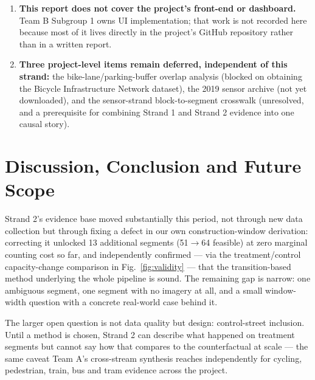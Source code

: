 \documentclass[10pt,conference]{IEEEtran}
\begin{document}
\begin{enumerate}[leftmargin=*]
\item \textbf{This report does not cover the project's front-end or dashboard.} Team B Subgroup 1 owns UI implementation; that work is not recorded here because most of it lives directly in the project's GitHub repository rather than in a written report.
\item \textbf{Three project-level items remain deferred, independent of this strand:} the bike-lane/parking-buffer overlap analysis (blocked on obtaining the Bicycle Infrastructure Network dataset), the 2019 sensor archive (not yet downloaded), and the sensor-strand block-to-segment crosswalk (unresolved, and a prerequisite for combining Strand 1 and Strand 2 evidence into one causal story).
\end{enumerate}

\section{Discussion, Conclusion and Future Scope}
Strand 2's evidence base moved substantially this period, not through new data collection but through fixing a defect in our own construction-window derivation: correcting it unlocked 13 additional segments (51$\rightarrow$64 feasible) at zero marginal counting cost so far, and independently confirmed --- via the treatment/control capacity-change comparison in Fig.~\ref{fig:validity} --- that the transition-based method underlying the whole pipeline is sound. The remaining gap is narrow: one ambiguous segment, one segment with no imagery at all, and a small window-width question with a concrete real-world case behind it.

The larger open question is not data quality but design: control-street inclusion. Until a method is chosen, Strand 2 can describe what happened on treatment segments but cannot say how that compares to the counterfactual at scale --- the same caveat Team A's cross-stream synthesis reaches independently for cycling, pedestrian, train, bus and tram evidence across the project.
\end{document}
